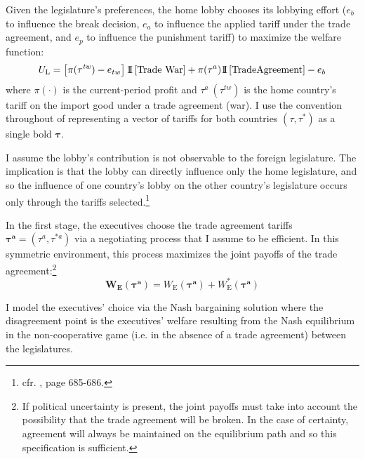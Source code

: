 \documentclass[authoryear, review]{elsarticle}
\newcommand{\bta}{\bm{\tau^a}}
\begin{document}
Given the legislature's preferences, the home lobby chooses its lobbying effort ($e_b$ to influence the break decision, $e_a$ to influence the applied tariff under the trade agreement, and $e_p$ to influence the punishment tariff) to maximize the welfare function:
\begin{equation}
  U_\text{L} = \left[ \pi(\tau^{\mathit{tw}}) - e_{tw} \right]1{\hskip -2.5 pt}\hbox{I} \left[ \text{Trade War} \right] + \pi(\tau^a)1{\hskip -2.5 pt}\hbox{I} \left[ \text{TradeAgreement} \right]  - e_b
  \label{eq:lv3}
\end{equation}
where $\pi(\cdot)$ is the current-period profit and $\tau^a \ (\tau^\mathit{tw})$ is the home country's tariff on the import good under a trade agreement (war). I use the convention throughout of representing a vector of tariffs for both countries $(\tau,\tau^*)$ as a single bold $\bm{\tau}$. 

I assume the lobby's contribution is not observable to the foreign legislature. The implication is that the lobby can directly influence only the home legislature, and so the influence of one country's lobby on the other country's legislature occurs only through the tariffs selected.\footnote{cfr. \citet{gh95}, page 685-686.}

In the first stage, the executives choose the trade agreement tariffs $\bta=\left(\tau^a,\tau^{*a} \right)$ via a negotiating process that I assume to be efficient. In this symmetric environment, this process maximizes the joint payoffs of the trade agreement:\footnote{If political uncertainty is present, the joint payoffs must take into account the possibility that the trade agreement will be broken. In the case of certainty, agreement will always be maintained on the equilibrium path and so this specification is sufficient.}
\begin{equation}
  \bm{W_\text{E}}(\bta) = W_\text{E}(\bta) + W_\text{E}^*(\bta)
  \label{eq:jv3}
\end{equation}

I model the executives' choice via the Nash bargaining solution where the disagreement point is the executives' welfare resulting from the Nash equilibrium in the non-cooperative game (i.e. in the absence of a trade agreement) between the legislatures.
\end{document}
